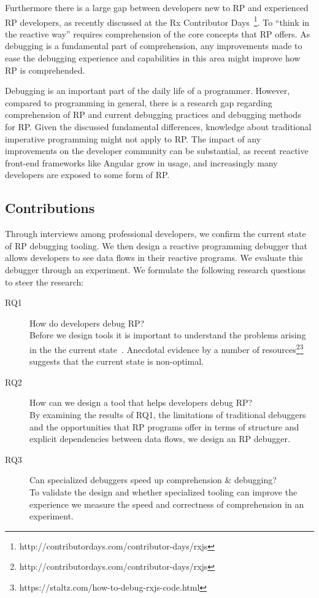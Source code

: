 Furthermore there is a large gap between developers new to RP and experienced RP developers, as recently discussed at the Rx Contributor Days~\footnote{http://contributordays.com/contributor-days/rxjs}. To ``think in the reactive way'' requires comprehension of the core concepts that RP offers. As debugging is a fundamental part of comprehension, any improvements made to ease the debugging experience and capabilities in this area might improve how RP is comprehended.

Debugging is an important part of the daily life of a programmer. However, compared to programming in general, there is a research gap regarding comprehension of RP and current debugging practices and debugging methods for RP. Given the discussed fundamental differences, knowledge about traditional imperative programming might not apply to RP. The impact of any improvements on the developer community can be substantial, as recent reactive front-end frameworks like Angular grow in usage, and increasingly many developers are exposed to some form of RP.

\subsection{Contributions}
Through interviews among professional developers, we confirm the current state of RP debugging tooling. We then design a reactive programming debugger that allows developers to see data flows in their reactive programs. We evaluate this debugger through an experiment.
We formulate the following research questions to steer the research:

\begin{description}
\item[RQ1] How do developers debug RP? \\
Before we design tools it is important to understand the problems arising in the the current state~\cite{singer2010examination}. Anecdotal evidence by a number of resources\footnote{http://contributordays.com/contributor-days/rxjs}\footnote{https://staltz.com/how-to-debug-rxjs-code.html}
suggests that the current state is non-optimal.

\item[RQ2] How can we design a tool that helps developers debug RP? \\
By examining the results of RQ1, the limitations of traditional debuggers and the opportunities that RP programs offer in terms of structure and explicit dependencies between data flows, we design an RP debugger.

\item[RQ3] Can specialized debuggers speed up comprehension \& debugging? \\
To validate the design and whether specialized tooling can improve the experience we measure the speed and correctness of comprehension in an experiment.

\end{description}
